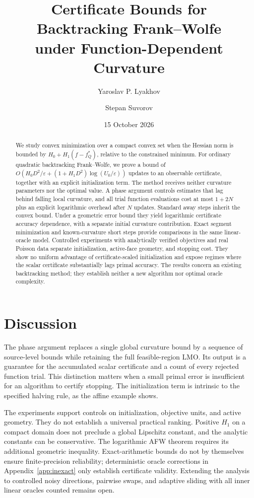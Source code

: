\documentclass[a4paper,11pt]{article}
\title{Certificate Bounds for Backtracking Frank--Wolfe\\under Function-Dependent Curvature}
\author{Yaroslav P. Lyakhov \and Stepan Suvorov}
\date{15 October 2026}
\begin{document}
\maketitle
\begin{abstract}
We study convex minimization over a compact convex set when the Hessian
norm is bounded by $H_0+H_1(f-f_Q^*)$, relative to the constrained minimum.
For ordinary quadratic backtracking Frank--Wolfe, we prove a bound of
$O(H_0D^2/\varepsilon+(1+H_1D^2)\log(U_0/\varepsilon))$ updates to an
observable certificate, together with an explicit initialization term.
The method receives neither curvature parameters nor the optimal value.
A phase argument controls estimates that lag behind falling local
curvature, and all trial function evaluations cost at most $1+2N$ plus
an explicit logarithmic overhead after $N$ updates. Standard away steps
inherit the convex bound. Under a geometric error bound they yield
logarithmic certificate accuracy dependence, with a separate initial
curvature contribution. Exact segment minimization and known-curvature
short steps provide comparisons in the same linear-oracle model.
Controlled experiments with analytically verified objectives and real
Poisson data separate initialization, active-face geometry, and stopping
cost. They show no uniform advantage of certificate-scaled initialization
and expose regimes where the scalar certificate substantially lags
primal accuracy. The results concern an existing backtracking method;
they establish neither a new algorithm nor optimal oracle complexity.
\end{abstract}






\section{Discussion}
The phase argument replaces a single global curvature bound by a sequence
of source-level bounds while retaining the full feasible-region LMO.
Its output is a guarantee for the accumulated scalar certificate and a
count of every rejected function trial. This distinction matters when a
small primal error is insufficient for an algorithm to certify stopping.
The initialization term is intrinsic to the specified halving rule,
as the affine example shows.

The experiments support controls on initialization, objective units,
and active geometry. They do not establish a universal practical
ranking. Positive $H_1$ on a compact domain does not preclude a global
Lipschitz constant, and the analytic constants can be conservative.
The logarithmic AFW theorem requires its additional geometric
inequality. Exact-arithmetic bounds do not by themselves ensure
finite-precision reliability; deterministic oracle corrections in
Appendix~\ref{app:inexact} only establish certificate validity.
Extending the analysis to controlled noisy directions, pairwise swaps,
and adaptive sliding with all inner linear oracles counted remains open.


\appendix

\end{document}
